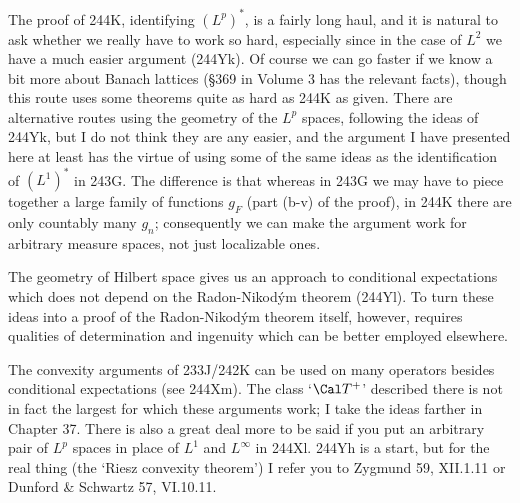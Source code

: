 {The proof of 244K, identifying $(L^p)^*$, is a fairly long haul, and it
is natural to ask whether we really have to work so hard, especially
since in the case of $L^2$ we have a much easier argument (244Yk).   Of
course we can go faster if we know a bit more about Banach lattices
(\S369 in Volume 3 has the relevant facts), though this route uses some
theorems quite as hard as 244K as given.   There are alternative routes
using the geometry of the $L^p$ spaces, following the ideas of 244Yk,
but I do not think they are any easier, and the argument I have
presented here at least has the virtue of using some of the same ideas
as the identification of $(L^1)^*$ in 243G.   The difference is that
whereas in
243G we may have to piece together a large family of functions $g_F$
(part (b-v) of the proof), in 244K there are only countably many $g_n$;
consequently we can make the argument work for arbitrary measure spaces,
not just localizable ones.

The geometry of Hilbert space gives us an approach to conditional
expectations which does not depend on the Radon-Nikod\'ym theorem
(244Yl).   To turn these ideas into a proof of the Radon-Nikod\'ym
theorem itself, however, requires qualities of determination and
ingenuity which can be better employed elsewhere.

The convexity arguments of 233J/242K can be used on many operators
besides conditional expectations (see 244Xm).   The class `$\Cal T^+$'
described there is not in fact the largest for which these arguments
work;  I take the ideas farther in Chapter 37.   There is also a great
deal more to be said if you put an arbitrary pair of $L^p$ spaces in
place of $L^1$ and $L^{\infty}$ in 244Xl.   244Yh is a start, but for
the real thing (the `Riesz convexity theorem') I refer you to
{\smc Zygmund 59}, XII.1.11 or {\smc Dunford \& Schwartz 57}, VI.10.11.
}%


\discrpage

